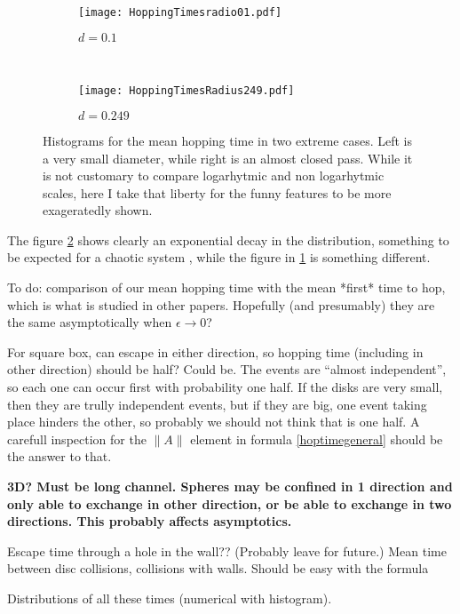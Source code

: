 \documentclass[letterpaper,12pt]{amsart}
\begin{document}
\begin{figure}[h]
        \centering
        \begin{subfigure}[b]{0.45\textwidth}
                \centering
                \texttt{[image: HoppingTimesradio01.pdf]}
                \caption{$d=0.1$}
                \label{smallradious}
        \end{subfigure}%
        ~ %
        \begin{subfigure}[b]{0.45\textwidth}
                \centering
                \texttt{[image: HoppingTimesRadius249.pdf]}
                \caption{$d=0.249$}
                \label{bigradious}
        \end{subfigure}       
        \caption{Histograms for the mean hopping time
in two extreme cases. Left is a very small diameter, while right is an almost
closed pass. While it is not customary to compare logarhytmic and non
logarhytmic scales, here I take that liberty for the funny features to be
more exageratedly shown.}\label{histohopps}
\end{figure}

The figure \ref{bigradious} shows clearly an exponential decay in the
distribution, something to be expected for a chaotic system \cite{OttLibro} , while the
figure in \ref{smallradious} is something different. 

To do: comparison of our mean hopping time with the mean *first* time to hop, which is what is studied in other papers.
Hopefully (and presumably) they are the same asymptotically when $\epsilon \to 0$?

For square box, can escape in either direction, so hopping time (including in other direction) should be half? Could be. The events are ``almost independent'', so each one
can occur first with probability one half. If the disks are very small, then
they are trully independent events, but if they are big, one event taking
place hinders the other, so probably we should not think that is 
one half. A carefull inspection for the $\|A\|$ element in formula \ref{hoptimegeneral}
should be the answer to that.


\textbf{ 3D?  Must be long channel. Spheres may be confined in 1 direction  and only able to exchange in other direction, or be able to exchange in two directions.
This probably affects asymptotics.}

Escape time through a hole in the wall?? (Probably leave for future.)
Mean time between disc collisions, collisions with walls. Should be easy with the formula

Distributions of all these times (numerical with histogram).



\end{document}
